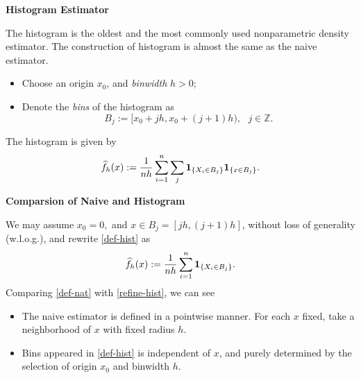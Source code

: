 \documentclass[19pt,landscaoe]{article}
\newcommand{\bone}{{\bf 1}}
\newcommand{\Z}{\mathbb{Z}}
\begin{document}
\newpage
{\LARGE\centerline{\textbf{Histogram Estimator}}}
\vskip25pt
\begin{minipage}{.9\textwidth}
    \Large
The histogram is the oldest and the most commonly used nonparametric density estimator. The construction of histogram is almost the same as the naive estimator.  
\begin{itemize}
   \item Choose an origin $x_0$, and {\it binwidth} $h>0$;
   \item Denote the {\it bins} of the histogram as 
   $$B_j:=[x_0+jh,x_0+(j+1)h),~~~j\in\Z.$$
\end{itemize}
The histogram is given by 
\begin{equation}\label{def-hist}
    \widehat{f}_h(x):=\frac1{nh}\sum_{i=1}^n\sum_{j}\bone_{\{X_i\in B_j\}}\bone_{\{x\in B_j\}}.
\end{equation}
\end{minipage}
   

\newpage
{\LARGE{\textbf{Comparsion of Naive and Histogram}}}
\vskip25pt
\begin{minipage}{.9\textwidth}
    \Large 
    We may assume  $x_0=0,$ and $x\in B_j=[jh,(j+1)h]$, without loss of generality (w.l.o.g.), and rewrite \eqref{def-hist} as  
    \begin{equation}\label{refine-hist}
        \widehat{f}_h(x):=\frac1{nh}\sum_{i=1}^n\bone_{\{X_i\in B_j\}}.
    \end{equation}
    Comparing \eqref{def-nat} with \eqref{refine-hist}, we can see 
\begin{itemize}
\item The naive estimator is defined in a pointwise manner. For each $x$ fixed, take a neighborhood of $x$ with fixed radius $h$.
\item Bins appeared in \eqref{def-hist} is independent of $x$, and purely determined by the selection of origin $x_0$ and binwidth $h$.
\end{itemize}
\end{minipage}


\end{document}
